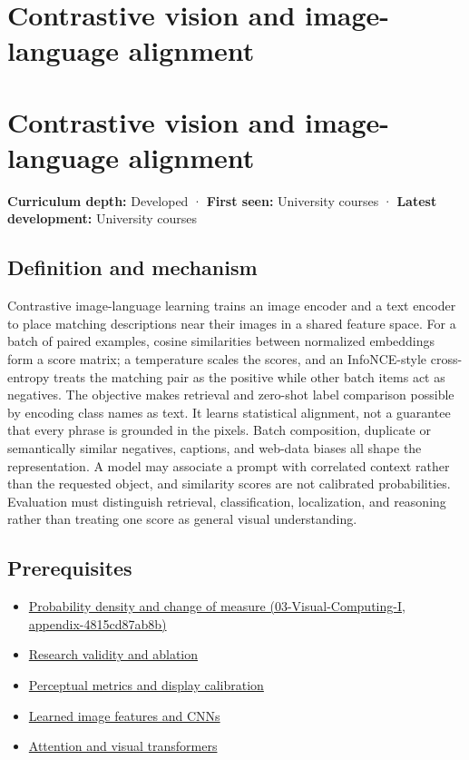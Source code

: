 \hypertarget{appendix-772f1fd96148}{}
\section*{Contrastive vision and image-language alignment}
\section{Contrastive vision and image-language alignment}\label{contrastive-vision-and-image-language-alignment}

\textbf{Curriculum depth:} Developed · \textbf{First seen:} University courses · \textbf{Latest development:} University courses

\subsection{Definition and mechanism}\label{definition-and-mechanism}

Contrastive image-language learning trains an image encoder and a text encoder to place matching descriptions near their images in a shared feature space. For a batch of paired examples, cosine similarities between normalized embeddings form a score matrix; a temperature scales the scores, and an InfoNCE-style cross-entropy treats the matching pair as the positive while other batch items act as negatives. The objective makes retrieval and zero-shot label comparison possible by encoding class names as text. It learns statistical alignment, not a guarantee that every phrase is grounded in the pixels. Batch composition, duplicate or semantically similar negatives, captions, and web-data biases all shape the representation. A model may associate a prompt with correlated context rather than the requested object, and similarity scores are not calibrated probabilities. Evaluation must distinguish retrieval, classification, localization, and reasoning rather than treating one score as general visual understanding.

\subsection{Prerequisites}\label{prerequisites}

\begin{itemize}
\tightlist
\item
  \href{}{Probability density and change of measure (03-Visual-Computing-I, appendix-4815cd87ab8b)}
\item
  \hyperref[appendix-65788587ef78]{Research validity and ablation}
\item
  \hyperref[appendix-b2c1846508bf]{Perceptual metrics and display calibration}
\item
  \hyperref[appendix-47c51ea026fb]{Learned image features and CNNs}
\item
  \hyperref[appendix-a9d5dfdd164a]{Attention and visual transformers}
\end{itemize}

